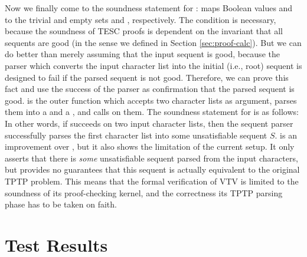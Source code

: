 \documentclass{lipics-v2021}
\begin{document}
Now we finally come to the soundness statement for :
 \AgdaSymbol{:}    
maps Boolean values  and  to
the trivial and empty sets  and , respectively.
The condition \AgdaSpace{} is necessary, because 
the soundness of TESC proofs is dependent on the invariant that all sequents are good
(in the sense we defined in Section \ref{sec:proof-calc}).
But we can do better than merely assuming that the input sequent is good,
because the parser which converts the input character list into the initial (i.e., root) 
sequent is designed to fail if the parsed sequent is not good. Therefore, we can prove 
this fact and use the success of the parser as confirmation that the parsed sequent is good.
 is the outer function which accepts two character lists as argument, 
parses them into a  and a , and calls 
on them. The soundness statement for  is as follows:
In other words, if  succeeds on two input character lists, 
then the sequent parser successfully parses the first character list into some unsatisfiable 
sequent $S$.  is an improvement over ,
but it also shows the limitation of the current setup. It only asserts that there is 
\textit{some} unsatisfiable sequent parsed from the input characters, 
but provides no guarantees that this sequent is actually equivalent to the original
TPTP problem. This means that the formal verification of VTV is limited to the soundness 
of its proof-checking kernel, and the correctness its TPTP parsing phase has to be 
taken on faith.



\section{Test Results} \label{sec:test-results}
\end{document}
